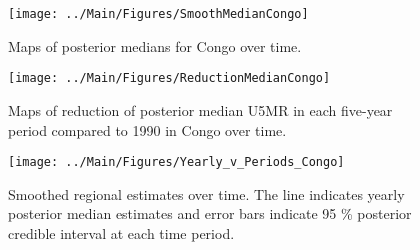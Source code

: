 \documentclass[12pt]{article}\usepackage[]{graphicx}\usepackage[]{color}
\newenvironment{knitrout}{}{} %
\begin{document}
\begin{knitrout}
\color{fgcolor}\begin{figure}[bht]

{\centering \texttt{[image: ../Main/Figures/SmoothMedianCongo]} 

}

\caption[Maps of posterior medians for Congo  over time]{Maps of posterior medians for Congo  over time.}\label{fig:unnamed-chunk-74}
\end{figure}


\end{knitrout}
\begin{knitrout}
\color{fgcolor}\begin{figure}[bht]

{\centering \texttt{[image: ../Main/Figures/ReductionMedianCongo]} 

}

\caption[Maps of reduction of posterior median U5MR in each five-year period compared to 1990 in Congo over time]{Maps of reduction of posterior median U5MR in each five-year period compared to 1990 in Congo over time.}\label{fig:unnamed-chunk-75}
\end{figure}


\end{knitrout}
\begin{knitrout}
\color{fgcolor}\begin{figure}[bht]

{\centering \texttt{[image: ../Main/Figures/Yearly\_v\_Periods\_Congo]} 

}

\caption[Smoothed regional estimates over time]{Smoothed regional estimates over time. The line indicates yearly posterior median estimates and error bars indicate 95 \% posterior credible interval at each time period.}\label{fig:unnamed-chunk-76}
\end{figure}


\end{knitrout}
\end{document}
